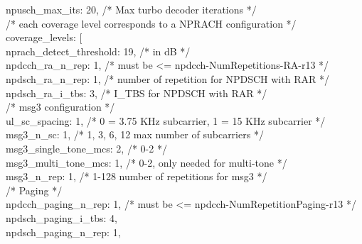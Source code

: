 {{      npusch\_max\_its: 20, /* Max turbo decoder iterations */\\

      /* each coverage level corresponds to a NPRACH configuration */\\
      coverage\_levels: [\\
        {
          nprach\_detect\_threshold: 19, /* in dB */\\
          npdcch\_ra\_n\_rep: 1, /* must be <= npdcch-NumRepetitions-RA-r13 */\\
          npdsch\_ra\_n\_rep: 1, /* number of repetition for NPDSCH with RAR */\\
          npdsch\_ra\_i\_tbs: 3, /* I\_TBS for NPDSCH with RAR */\\

          /* msg3 configuration */\\
          ul\_sc\_spacing: 1, /* 0 = 3.75 KHz subcarrier, 1 = 15 KHz subcarrier */\\
          msg3\_n\_sc: 1, /* 1, 3, 6, 12 max number of subcarriers */\\
          msg3\_single\_tone\_mcs: 2, /* 0-2 */\\
          msg3\_multi\_tone\_mcs: 1, /* 0-2, only needed for multi-tone */\\
          msg3\_n\_rep: 1, /* 1-128 number of repetitions for msg3 */\\

          /* Paging */\\
          npdcch\_paging\_n\_rep: 1, /* must be <= npdcch-NumRepetitionPaging-r13 */\\
          npdsch\_paging\_i\_tbs: 4,\\
          npdsch\_paging\_n\_rep: 1,\\

}}}
